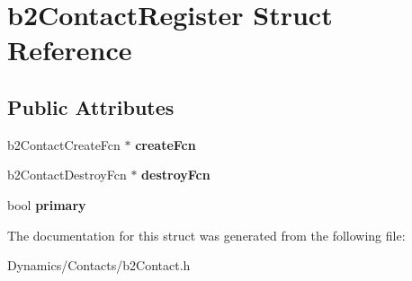 \hypertarget{structb2ContactRegister}{}\section{b2\+Contact\+Register Struct Reference}
\label{structb2ContactRegister}
\subsection*{Public Attributes}
\begin{DoxyCompactItemize}
\item 
\mbox{\label{structb2ContactRegister_ae065de11ab2f164bd1b8e3a461b41824}} 
b2\+Contact\+Create\+Fcn $\ast$ {\bfseries create\+Fcn}
\item 
\mbox{\label{structb2ContactRegister_a95862aec746f5fd6ffa00a6729dec61f}} 
b2\+Contact\+Destroy\+Fcn $\ast$ {\bfseries destroy\+Fcn}
\item 
\mbox{\label{structb2ContactRegister_a43f2d79909505b785b9034b21a56525e}} 
bool {\bfseries primary}
\end{DoxyCompactItemize}


The documentation for this struct was generated from the following file\+:\begin{DoxyCompactItemize}
\item 
Dynamics/\+Contacts/b2\+Contact.\+h\end{DoxyCompactItemize}
